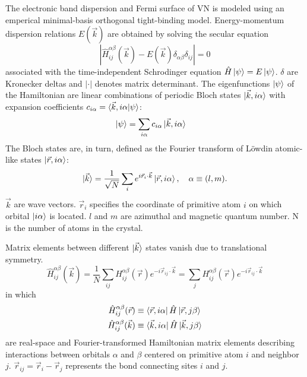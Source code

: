 \documentclass[twocolumn,showpacs,preprintnumbers,superscriptaddress,prb,floatfix,aps,10pt]{revtex4-1}
\newcommand*{\ham}{\hat{H}}
\newcommand*{\bloch}{\ket{\vec{k}, i\alpha}}
\newcommand*{\lowdin}{\ket{\vec{r}, i\alpha}}
\newcommand*{\bondvec}{\vec{r}_{ij}}
\begin{document}
The electronic band dispersion and Fermi surface of VN is modeled using an emperical minimal-basis orthogonal tight-binding model. Energy-momentum dispersion relations $E(\vec{k})$ are obtained by solving the secular equation
\begin{equation}
\label{eq:secular}
\left| \ham^{\alpha\beta}_{ij}(\vec{k}) - E(\vec{k})\delta_{\alpha\beta}\delta_{ij} \right| = 0
\end{equation}
%
associated with the time-independent Schrodinger equation $\hat{H} \ket{\psi} = E \ket{\psi}$. $\delta$ are Kronecker deltas and $|\cdot |$ denotes matrix determinant. The eigenfunctions $\ket{\psi}$ of the Hamiltonian are linear combinations of periodic Bloch states $\bloch$ with expansion coefficients
$c_{i\alpha} = \braket{\vec{k},i\alpha | \psi}$:
\begin{align}
\ket{\psi}  &= \sum_{i\alpha} c_{i\alpha} \bloch
\end{align}
%
The Bloch states are, in turn, defined as the Fourier transform of L\"{o}wdin atomic-like states $\lowdin$:
\begin{equation}
\ket{\vec{k}} = \frac{1}{\sqrt{N}} \sum_i e^{i\vec{r}_i\cdot\vec{k}} \ket{\vec{r}, i\alpha}, 
\quad
\alpha \equiv (l,m).
\end{equation}
%
$\vec{k}$ are wave vectors. $\vec{r}_i$ specifies the coordinate of primitive atom $i$ on which orbital $\ket{i\alpha}$ is located. $l$ and $m$ are azimuthal and magnetic quantum number. N is the number of atoms in the crystal.

Matrix elements between different $\ket{\vec{k}}$ states vanish due to translational symmetry. 
\begin{equation}
\label{eq:ham}
\ham^{\alpha\beta}_{ij}(\vec{k}) 
= \frac{1}{N} \sum_{ij} H^{\alpha\beta}_{ij}(\vec{r}) e^{-i\vec{r}_{ij} \cdot \vec{k} } 
= \sum_j H^{\alpha\beta}_{ij}(\vec{r}) e^{-i\vec{r}_{ij} \cdot \vec{k}}
\end{equation}
%
in which
%
\begin{align}
\ham^{\alpha\beta}_{ij}(\vec{r}) &\equiv \bra{\vec{r},i\alpha} \ham\ket{\vec{r},j\beta} \\
\ham^{\alpha\beta}_{ij}(\vec{k}) &\equiv \bra{\vec{k},i\alpha} \ham\ket{\vec{k},j\beta}
\end{align}
%
are real-space and Fourier-transformed Hamiltonian matrix elements describing interactions between orbitals $\alpha$ and $\beta$ centered on primitive atom $i$ and neighbor $j$. $\bondvec = \vec{r}_i - \vec{r}_j$ represents the bond connecting sites $i$ and $j$. 
\end{document}
